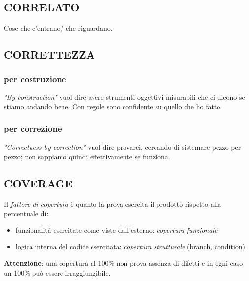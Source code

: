 		
		\subsection{CORRELATO}  \label{correlato}
		Cose che c'entrano/ che riguardano.
		
		
		\subsection{CORRETTEZZA}	 \label{correttezza}
			\subsubsection{per costruzione}	\label{byconstruction}
			\textit{"By construction"} vuol dire avere strumenti oggettivi misurabili che ci dicono se stiamo andando bene. Con regole sono confidente su quello che ho fatto.
			\subsubsection{per correzione} \label{bycorrection}
			\textit{"Correctness by correction"} vuol dire provarci, cercando di sistemare pezzo per pezzo; non sappiamo quindi effettivamente se funziona.
			
		\subsection{COVERAGE}		\label{coverage}
		Il \textit{fattore di copertura} è quanto la prova esercita il prodotto rispetto alla percentuale di:
		\begin{itemize}
			\item funzionalità esercitate come viste dall'esterno: \textit{copertura funzionale}
			\item logica interna del codice esercitata: \textit{copertura strutturale} (branch, condition)
		\end{itemize}	
		\textbf{Attenzione}: una copertura al 100\% non prova assenza di difetti e in ogni caso un 100\% può essere irraggiungibile.
			
			
